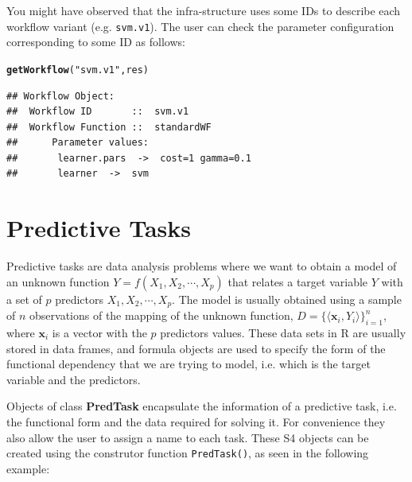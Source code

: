 \documentclass[10pt,a4paper]{article}\usepackage[]{graphicx}\usepackage[]{color}
\makeatletter
\newcommand{\hlstr}[1]{\textcolor[rgb]{0.192,0.494,0.8}{#1}}%
\newcommand{\hlstd}[1]{\textcolor[rgb]{0.345,0.345,0.345}{#1}}%
\newcommand{\hlkwd}[1]{\textcolor[rgb]{0.737,0.353,0.396}{\textbf{#1}}}%
\newenvironment{kframe}{%
 \def\at@end@of@kframe{}%
 \ifinner\ifhmode%
  \def\at@end@of@kframe{\end{minipage}}%
  \begin{minipage}{\columnwidth}%
 \fi\fi%
 \def\FrameCommand##1{\hskip\@totalleftmargin \hskip-\fboxsep
 \colorbox{shadecolor}{##1}\hskip-\fboxsep
     \hskip-\linewidth \hskip-\@totalleftmargin \hskip\columnwidth}%
 \MakeFramed {\advance\hsize-\width
   \@totalleftmargin\z@ \linewidth\hsize
   \@setminipage}}%
 {\par\unskip\endMakeFramed%
 \at@end@of@kframe}
\newenvironment{knitrout}{}{} %
\makeatother
\begin{document}
You might have observed that the infra-structure uses some IDs to
describe each workflow variant (e.g. \texttt{svm.v1}). The user can check
the parameter configuration corresponding to some ID as follows:

\begin{knitrout}
\color{fgcolor}\begin{kframe}
\begin{alltt}
\hlkwd{getWorkflow}\hlstd{(}\hlstr{"svm.v1"}\hlstd{, res)}
\end{alltt}
\begin{verbatim}
## Workflow Object:
## 	Workflow ID       ::  svm.v1 
## 	Workflow Function ::  standardWF
## 		Parameter values:
## 		 learner.pars  ->  cost=1 gamma=0.1 
## 		 learner  ->  svm
\end{verbatim}
\end{kframe}
\end{knitrout}


\section{Predictive Tasks}

Predictive tasks are data analysis problems where we want to obtain a
model of an unknown function $Y=f(X_1, X_2, \cdots, X_p)$ that relates
a target variable $Y$ with a set of $p$ predictors $X_1, X_2, \cdots,
X_p$. The model is usually obtained using a sample of $n$ observations
of the mapping of the unknown function, $D=\{\langle \mathbf{x}_i,
Y_i\rangle\}_{i=1}^n$, where $\mathbf{x}_i$ is a vector with the $p$
predictors values.  These data sets in R are usually stored in data
frames, and formula objects are used to specify the form of the
functional dependency that we are trying to model, i.e. which is the
target variable and the predictors.

Objects of class \textbf{PredTask} encapsulate the information of a
predictive task, i.e. the functional form and the data required for
solving it. For convenience they also allow the user to assign a name
to each task. These S4 objects can be created using the construtor
function \texttt{PredTask()}, as seen in the following example:
\end{document}
